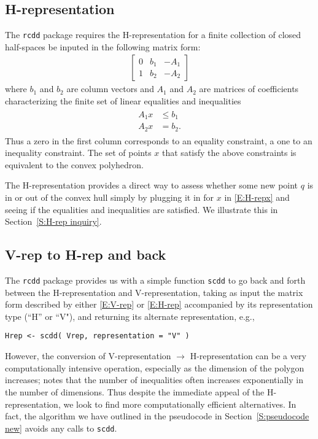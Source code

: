 \subsection{H-representation} \label{S:H-rep}
The \texttt{rcdd} package requires the H-representation for a finite
collection of closed half-spaces be inputed in the following matrix form:
\begin{align} \label{E:H-rep}
	\left[\begin{array}{ccc}	0 & b_1 & -A_1 \\ 1 & b_2 & -A_2
	\end{array}\right]
\end{align}
where $b_1$ and $b_2$ are column vectors and $A_1$ and $A_2$ are matrices 
of coefficients characterizing the finite set of 
linear equalities and inequalities
\begin{align} \label{E:H-repx}
\begin{split}
	A_1 x &\leq b_1 \\
	A_2 x &= b_2.
\end{split}
\end{align}
Thus a zero in the first column corresponds to an equality constraint, a one to
an inequality constraint.
The set of points $x$ that satisfy the above constraints is equivalent to the
convex polyhedron.

The H-representation provides a direct
way to assess whether some new point $q$ is in or out of the convex hull
simply by plugging it in for $x$ in \eqref{E:H-repx} and seeing if the equalities
and inequalities are satisfied.  We illustrate this in Section~\ref{S:H-rep inquiry}.

\subsection{V-rep to H-rep and back}
The \texttt{rcdd} package provides us with a simple function \texttt{scdd}
to go back and forth between the H-representation and V-representation, taking as input
the matrix form described by either \eqref{E:V-rep} or \eqref{E:H-rep} accompanied
by its representation type (``H'' or ``V"), and returning its alternate representation, e.g.,
\begin{verbatim}
Hrep <- scdd( Vrep, representation = "V" )
\end{verbatim}

However, the conversion of V-representation $\rightarrow$ H-representation 
can be a very computationally intensive operation, especially as the dimension 
of the polygon increases;
\citet{Fukuda:2008} notes that the number of inequalities often increases 
exponentially in the number of dimensions.  Thus despite the immediate appeal
of the H-representation, we look to find more computationally efficient alternatives.
In fact, the algorithm we have outlined in the pseudocode in Section~\ref{S:pseudocode new} avoids any calls to \texttt{scdd}.


